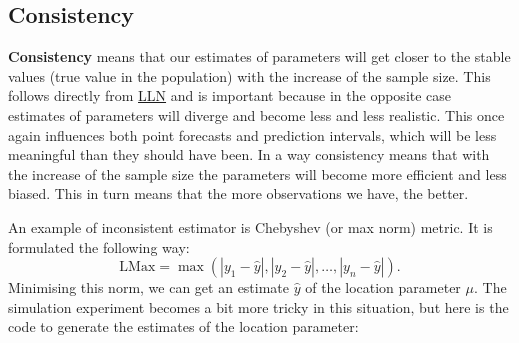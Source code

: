\documentclass[
]{book}
\theoremstyle{definition}
\theoremstyle{definition}
\theoremstyle{definition}
\theoremstyle{definition}
\theoremstyle{remark}
\begin{document}
\hypertarget{estimatesPropertiesConsistency}{%
\subsection{Consistency}\label{estimatesPropertiesConsistency}}

\textbf{Consistency} means that our estimates of parameters will get closer to the stable values (true value in the population) with the increase of the sample size. This follows directly from \protect\hyperlink{LLNandCLT}{LLN} and is important because in the opposite case estimates of parameters will diverge and become less and less realistic. This once again influences both point forecasts and prediction intervals, which will be less meaningful than they should have been. In a way consistency means that with the increase of the sample size the parameters will become more efficient and less biased. This in turn means that the more observations we have, the better.

An example of inconsistent estimator is Chebyshev (or max norm) metric. It is formulated the following way:
\begin{equation}
    \mathrm{LMax} = \max \left(|y_1-\hat{y}|, |y_2-\hat{y}|, \dots, |y_n-\hat{y}| \right).
    \label{eq:chebyshevNorm}
\end{equation}
Minimising this norm, we can get an estimate \(\hat{y}\) of the location parameter \(\mu\). The simulation experiment becomes a bit more tricky in this situation, but here is the code to generate the estimates of the location parameter:
\end{document}
